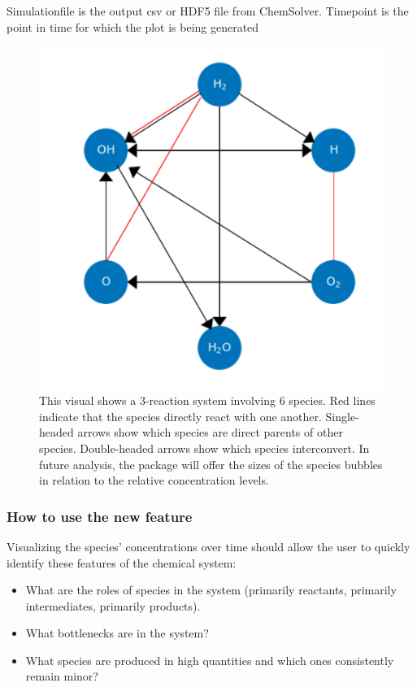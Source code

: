 \documentclass[12pt]{article}
\begin{document}
Simulationfile is the output csv or HDF5 file from ChemSolver. Timepoint is the point in time for which the plot is being generated



\begin{figure}[h!]
  \caption{This visual shows a 3-reaction system involving 6 species. Red lines indicate that the species directly react with one another. Single-headed arrows show which species are direct parents of other species. Double-headed arrows show which species interconvert. In future analysis, the package will offer the sizes of the species bubbles in relation to the relative concentration levels. }
  \centering
  \includegraphics[width=\textwidth]{22.png}
\end{figure}

\newpage


\subsubsection{How to use the new feature}
Visualizing the species’ concentrations over time should allow the user to quickly identify these features of the chemical system:

\begin{itemize}

\item What are the roles of species in the system (primarily reactants, primarily intermediates, primarily products).
\item What bottlenecks are in the system?
\item What species are produced in high quantities and which ones consistently remain minor?

\end{itemize}
\end{document}
